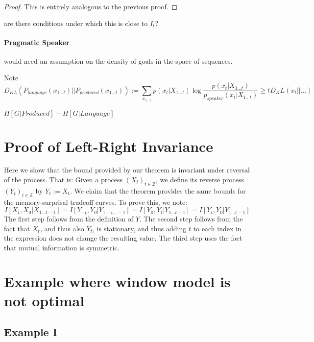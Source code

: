 \documentclass[11pt,letterpaper]{article}
\newcounter{theorem}
\begin{document}
\begin{proof}
This is entirely analogous to the previous proof.
\end{proof}


are there conditions under which this is close to $I_t$?

\paragraph{Pragmatic Speaker}

would need an assumption on the density of goals in the space of sequences.


Note 
\begin{equation}
	D_{KL}(P_{language}(x_{1\dots t})||P_{produced}(x_{1\dots t}))  := \sum_{x_{1\dots t}} p(x_t|X_{1\dots t}) \log \frac{p(x_t|X_{1\dots t})}{p_{speaker}(x_t|X_{1\dots t})} \geq t D_KL(x_t||...)
\end{equation}

$H[G|Produced] - H[G|Language]$



\section{Proof of Left-Right Invariance}

Here we show that the bound provided by our theorem is invariant under reversal of the process.
That is: Given a process $(X_t)_{t \in \mathbb{Z}}$, we define its reverse process $(Y_t)_{t \in \mathbb{Z}}$ by $Y_t := X_t$.
We claim that the theorem provides the same bounds for the memory-surprisal tradeoff curves.
To prove this, we note:
\begin{equation}
	I[X_t, X_0|X_{1\dots t-1}] = I[Y_{-t}, Y_0|Y_{1-t\dots -1}] = I[Y_0, Y_t|Y_{1\dots t-1}] = I[Y_t, Y_0|Y_{1\dots t-1}]
\end{equation}
The first step follows from the definition of $Y$. The second step follows from the fact that $X_t$, and thus also $Y_t$, is stationary, and thus adding $t$ to each index in the expression does not change the resulting value. The third step uses the fact that mutual information is symmetric.


\section{Example where window model is not optimal}

\subsection{Example I}
\end{document}

